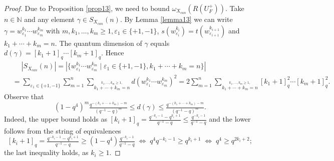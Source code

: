 \documentclass[11 pt, leqno]{amsart}
\newcommand{\eps}{\varepsilon}
\newcommand{\NN}{\mathbb{N}}
\theoremstyle{definition}
\numberwithin{equation}{section}
\begin{document}
\begin{proof}
	Due to Proposition \ref{prop13}, we need to bound $\omega_{X_{can}}(R(U_F^+))$. Take $n\in\NN$ and any element $\gamma\in S_{X_{can}}(n)$. By Lemma \ref{lemma13} we can write $\gamma=w^{k_1}_{\eps_1}\cdots w^{k_m}_{\eps_m}$ with $m,k_1,\dotsc,k_m\ge 1,\eps_1\in\{+1,-1\}$, $s(w^{k_i}_{\eps_i})=t(w^{k_{i+1}}_{\eps_{i+1}})$ and $k_1+\cdots+k_m=n$. The quantum dimension of $\gamma$ equals $d(\gamma)=[k_1+1]_q\cdots [k_m+1]_q
	$. Hence 
	\[\begin{split}
&\quad\;
|S_{X_{can}}(n)|=|\{w^{k_1}_{\eps_1}\cdots w^{k_m}_{\eps_m}\mid 
			\eps_1\in \{+1,-1\},k_1+\cdots +k_m = n\}|\\
			&=
			\sum_{\eps_1\in \{+1,-1\}}\sum_{m=1}^{n} \sum_{\overset{k_1,\dotsc,k_m\ge 1,}{k_1+\cdots+k_m=n}} d(w^{k_1}_{\eps_1} \cdots w^{k_m}_{\eps_m})^2=
			2 \sum_{m=1}^{n} \sum_{\overset{k_1,\dotsc,k_m\ge 1,}{k_1+\cdots+k_m=n}} [k_1+1]_q^2 \cdots [k_m+1]_q^2.
	\end{split}\]
	Observe that 
	\begin{equation}\label{eq30}
		(1-q^4)^m 
		\tfrac{ q^{-(k_1+\cdots +k_m)-m}}{(q^{-1}-q)^{m}}\le 
		d(\gamma) \le \tfrac{ q^{-(k_1+\cdots +k_m)-m}}{(q^{-1}-q)^{m}}.
	\end{equation}
	Indeed, the upper bound holds as $[k_i+1]_q=\tfrac{q^{-k_i-1}-q^{k_i+1}}{q^{-1}-q}\le \tfrac{q^{-k_i-1}}{q^{-1}-q}$ and the lower follows from the string of equivalences 
	\[
	[k_i+1]_q = 
	\tfrac{q^{-k_i-1}-q^{k_i+1}}{q^{-1}-q} \ge 
	(1-q^4) 
	\tfrac{q^{-k_i-1}}{q^{-1}-q}\;\Leftrightarrow\; 
	q^4 q^{-k_i-1} \ge q^{k_i+1}\;\Leftrightarrow\;
	q^4 \ge q^{2k_i+2};
	\]
the last inequality holds, as $k_i\ge 1$. 
	

\end{proof}
\end{document}
